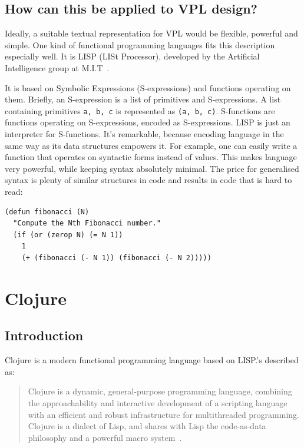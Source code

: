 \documentclass[11pt]{scrartcl}
\begin{document}
\subsection{How can this be applied to VPL design?}

Ideally, a suitable textual representation for VPL would be flexible, powerful
and simple.
One kind of functional programming languages fits this description especially
well.
It is LISP (LISt Processor), developed by the Artificial Intelligence group at
M.I.T~\cite{recursive}.

It is based on Symbolic Expressions (S-expressions) and functions operating on
them.
Briefly, an S-expression is a list of primitives and S-expressions.
A list containing primitives \lstinline|a, b, c| is represented as \lstinline|(a, b, c)|.
S-functions are functions operating on S-expressions, encoded as S-expressions.
LISP is just an interpreter for S-functions.
It’s remarkable, because encoding language in the same way as its data
structures empowers it.
For example, one can easily write a function that operates on syntactic forms
instead of values.
This makes language very powerful, while keeping syntax absolutely minimal.
The price for generalised syntax is plenty of similar structures in code and
results in code that is hard to read:

\begin{lstlisting}
(defun fibonacci (N)
  "Compute the Nth Fibonacci number."
  (if (or (zerop N) (= N 1))
    1
    (+ (fibonacci (- N 1)) (fibonacci (- N 2)))))
\end{lstlisting}

\section{Clojure}
\subsection{Introduction}
Clojure is a modern functional programming language based on LISP.\@It’s
described as:

\blockquote{Clojure is a dynamic, general-purpose
  programming language, combining the approachability and interactive
  development of a scripting language with an efficient and robust
  infrastructure for multithreaded programming. Clojure is a dialect of Lisp,
  and shares with Lisp the code-as-data philosophy and a powerful macro
  system~\cite{clojure_website}.}
\end{document}
